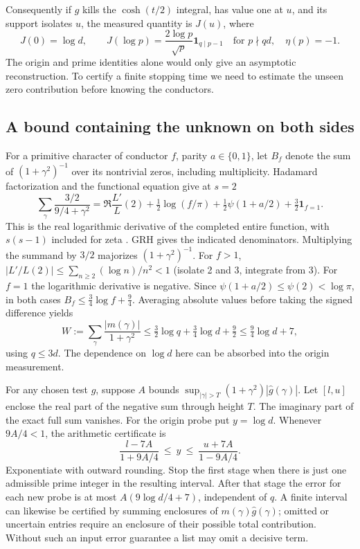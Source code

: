 Consequently if $g$ kills the $\cosh(t/2)$ integral, has value one at $u$,
and its support isolates $u$, the measured quantity is $J(u)$, where
\[
 J(0)=\log d,\qquad J(\log p)=
 \frac{2\log p}{\sqrt p}\mathbf1_{q\mid p-1}
 \quad\text{for }p\nmid qd,\quad\eta(p)=-1 .
\]
The origin and prime identities alone would only give an asymptotic
reconstruction. To certify a finite stopping time we need to estimate the
unseen zero contribution before knowing the conductors.

\subsection*{A bound containing the unknown on both sides}
For a primitive character of conductor $f$, parity $a\in\{0,1\}$, let $B_f$
denote the sum of $(1+\gamma^2)^{-1}$ over its nontrivial zeros, including
multiplicity. Hadamard factorization and the functional equation give at $s=2$
\[
 \sum_\gamma\frac{3/2}{9/4+\gamma^2}=
 \Re\frac{L'}L(2)+\tfrac12\log(f/\pi)+\tfrac12\psi(1+a/2)
 +\tfrac32\mathbf1_{f=1}.
\]
This is the real logarithmic derivative of the completed entire function, with
$s(s-1)$ included for zeta \cite{lls}. GRH gives the indicated denominators.
Multiplying the summand by $3/2$ majorizes $(1+\gamma^2)^{-1}$.
For $f>1$, $|L'/L(2)|\le\sum_{n\ge2}(\log n)/n^2<1$ (isolate 2 and 3,
integrate from 3). For $f=1$ the logarithmic derivative is negative.
Since $\psi(1+a/2)\le\psi(2)<\log\pi$, in both cases
$B_f\le\tfrac34\log f+\tfrac94$.
Averaging absolute values before taking the signed difference yields
\[
 W:=\sum_\gamma\frac{|m(\gamma)|}{1+\gamma^2}
 \le \tfrac32\log q+\tfrac34\log d+\tfrac92
 \le \tfrac94\log d+7 ,
\]
using $q\le3d$. The dependence on $\log d$ here can be absorbed into the
origin measurement.

For any chosen test $g$, suppose $A$ bounds
$\sup_{|\gamma|>T}(1+\gamma^2)|\widehat g(\gamma)|$.
Let $[l,u]$ enclose the real part of the negative sum through height $T$.
The imaginary part of the exact full sum vanishes. For the origin probe put
$y=\log d$. Whenever $9A/4<1$, the arithmetic certificate is
\[
 \boxed{\quad \frac{l-7A}{1+9A/4}\ \le\ y\ \le \ \frac{u+7A}{1-9A/4}.\quad}
\]
Exponentiate with outward rounding. Stop the first stage when there is just
one admissible prime integer in the resulting interval. After that stage the
error for each new probe is at most $A(9\log d/4+7)$, independent of $q$.
A finite interval can likewise be certified by summing enclosures of
$m(\gamma)\widehat g(\gamma)$; omitted or uncertain entries require an enclosure
of their possible total contribution. Without such an input error guarantee a
list may omit a decisive term.

